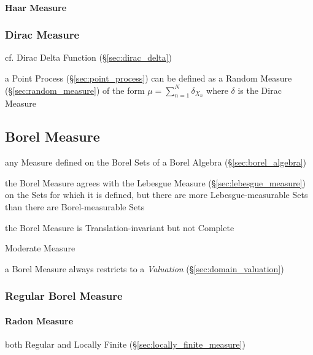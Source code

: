 \paragraph{Haar Measure}\label{sec:haar_measure}\hfill



\subsubsection{Dirac Measure}\label{sec:dirac_measure}

cf. Dirac Delta Function (\S\ref{sec:dirac_delta})

a Point Process (\S\ref{sec:point_process}) can be defined as a Random Measure
(\S\ref{sec:random_measure}) of the form $\mu = \sum_{n=1}^N \delta_{X_n}$ where
$\delta$ is the Dirac Measure



\subsection{Borel Measure}\label{sec:borel_measure}

any Measure defined on the Borel Sets of a Borel Algebra
(\S\ref{sec:borel_algebra})

the Borel Measure agrees with the Lebesgue Measure
(\S\ref{sec:lebesgue_measure}) on the Sets for which it is defined, but there
are more Lebesgue-measurable Sets than there are Borel-measurable Sets

the Borel Measure is Translation-invariant but not Complete

Moderate Measure

\fist a Borel Measure always restricts to a \emph{Valuation}
(\S\ref{sec:domain_valuation})



\subsubsection{Regular Borel Measure}\label{sec:regualr_borel}\hfill

\paragraph{Radon Measure}\label{sec:radon_measure}\hfill

both Regular and Locally Finite (\S\ref{sec:locally_finite_measure})


